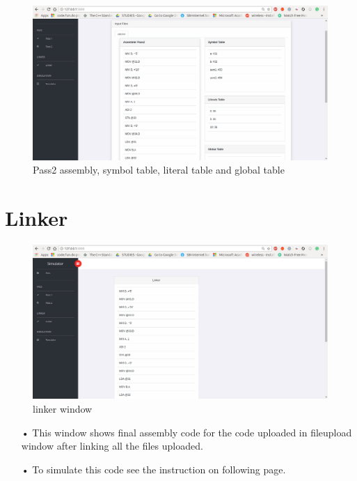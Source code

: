 \documentclass{scrreprt}
\begin{document}
\begin{figure}[H]
\centering
\includegraphics[width=\textwidth, keepaspectratio]{pass2.png}
\caption{Pass2 assembly, symbol table, literal table and global table}
\end{figure}

\section{Linker}
\begin{figure}[H]
\centering
\includegraphics[width=\textwidth, keepaspectratio]{linker.png}
\caption{linker window}
\end{figure}
\begin{enumerate}
\item[•] This window shows final assembly code for the code uploaded in fileupload window after linking all the files uploaded.
\item[•] To simulate this code see the instruction on following page.
\end{enumerate}

\newpage
\end{document}
